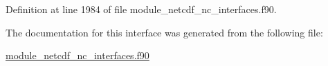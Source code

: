 Definition at line 1984 of file module\+\_\+netcdf\+\_\+nc\+\_\+interfaces.\+f90.



The documentation for this interface was generated from the following file\+:\begin{DoxyCompactItemize}
\item 
\hyperlink{module__netcdf__nc__interfaces_8f90}{module\+\_\+netcdf\+\_\+nc\+\_\+interfaces.\+f90}\end{DoxyCompactItemize}
